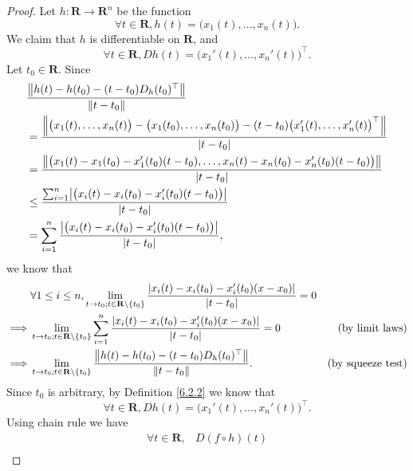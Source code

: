 \begin{proof}
    Let \(h : \mathbf{R} \to \mathbf{R}^n\) be the function
    \[
        \forall t \in \mathbf{R}, h(t) = \big(x_1(t), \dots, x_n(t)\big).
    \]
    We claim that \(h\) is differentiable on \(\mathbf{R}\), and
    \[
        \forall t \in \mathbf{R}, D h(t) = \big(x_1'(t), \dots, x_n'(t)\big)^\top.
    \]
    Let \(t_0 \in \mathbf{R}\).
    Since
    \begin{align*}
         & \frac{\norm*{h(t) - h(t_0) - (t - t_0) D_h(t_0)^\top}}{\norm*{t - t_0}}                                                                                   \\
         & = \frac{\norm*{\big(x_1(t), \dots, x_n(t)\big) - \big(x_1(t_0), \dots, x_n(t_0)\big) - (t - t_0) \big(x_1'(t), \dots, x_n'(t)\big)^\top}}{\abs*{t - t_0}} \\
         & = \frac{\norm*{\big(x_1(t) - x_1(t_0) - x_1'(t_0)(t - t_0), \dots, x_n(t) - x_n(t_0) - x_n'(t_0)(t - t_0)\big)}}{\abs*{t - t_0}}                          \\
         & \leq \frac{\sum_{i = 1}^n \abs*{\big(x_i(t) - x_i(t_0) - x_i'(t_0)(t - t_0)\big)}}{\abs*{t - t_0}}                                                        \\
         & = \sum_{i = 1}^n \frac{\abs*{\big(x_i(t) - x_i(t_0) - x_i'(t_0)(t - t_0)\big)}}{\abs*{t - t_0}},
    \end{align*}
    we know that
    \begin{align*}
                 & \forall 1 \leq i \leq n, \lim_{t \to t_0 ; t \in \mathbf{R} \setminus \{t_0\}} \frac{\abs*{x_i(t) - x_i(t_0) - x_i'(t_0)(x - x_0)}}{\abs*{t - t_0}} = 0                            \\
        \implies & \lim_{t \to t_0 ; t \in \mathbf{R} \setminus \{t_0\}} \sum_{i = 1}^n \frac{\abs*{x_i(t) - x_i(t_0) - x_i'(t_0)(x - x_0)}}{\abs*{t - t_0}} = 0           & \text{(by limit laws)}   \\
        \implies & \lim_{t \to t_0 ; t \in \mathbf{R} \setminus \{t_0\}} \frac{\norm*{h(t) - h(t_0) - (t - t_0) D_h(t_0)^\top}}{\norm*{t - t_0}}.                          & \text{(by squeeze test)}
    \end{align*}
    Since \(t_0\) is arbitrary, by Definition \ref{6.2.2} we know that
    \[
        \forall t \in \mathbf{R}, D h(t) = \big(x_1'(t), \dots, x_n'(t)\big)^\top.
    \]
    Using chain rule we have
    \begin{align*}
        \forall t \in \mathbf{R}, & D (f \circ h)(t)                                                                                                                           \\

\end{align*}
\end{proof}

